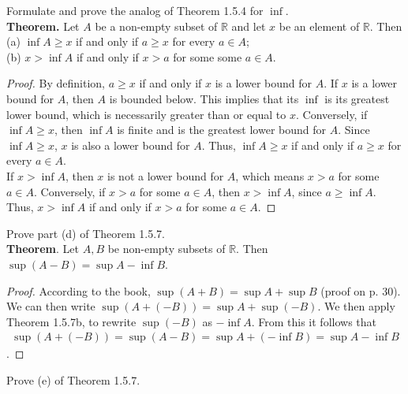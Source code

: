\documentclass[12pt]{book}
\newenvironment{exercise}[2][Exercise]{\begin{trivlist}
\item[\hskip \labelsep {\bfseries #1}\hskip \labelsep {\bfseries #2.}]}{\end{trivlist}}
\begin{document}
\begin{exercise}{1.4.6}
\begin{exercise}{1.5.5}
Formulate and prove the analog of Theorem 1.5.4 for $\inf$. \\

\textbf{Theorem.} Let $A$ be a non-empty subset of $\mathbb{R}$ and let $x$ be an element of $\mathbb{R}$. Then \\ 
(a) $\inf A \geq x$ if and only if $a \geq x$ for every $a \in A$;\\
(b) $x > \inf A$ if and only if $x > a$ for some some $a \in A$.

	\begin{proof}
	By definition, $a \geq x$ if and only if $x$ is a lower bound for $A$. If $x$ is a lower bound for $A$, then $A$ is bounded below. This implies that its $\inf$ is its greatest lower bound, which is necessarily greater than or equal to $x$. Conversely, if $\inf A \geq x$, then $\inf A$ is finite and is the greatest lower bound for $A$. Since $\inf A \geq x$, $x$ is also  a lower bound for $A$. Thus, $\inf A \geq x$ if and only if $a \geq x$ for every $a \in A$. \\
	If $x > \inf A$, then $x$ is not a lower bound for $A$, which means $x >a$ for some $a \in A$. Conversely, if $x > a$ for some $a  \in A$, then $x> \inf A$, since $a \geq \inf A$. Thus, $x > \inf A$ if and only if $x > a$ for some $a \in A$.
	\end{proof}
\end{exercise}




\begin{exercise}{1.5.6}
Prove part (d) of Theorem 1.5.7.\\

\textbf{Theorem}. Let $A,B$ be non-empty subsets of $\mathbb{R}$. Then $\sup (A-B) = \sup A - \inf B$.

	\begin{proof}
	According to the book, $\sup(A+B) = \sup A + \sup B$ (proof on p. 30). We can then write $\sup (A + (-B) ) = \sup A + \sup(-B)$. We then apply Theorem 1.5.7b, to rewrite $\sup(-B)$ as $-\inf A$. From this it follows that 
	\begin{align*}
	\sup(A + (-B)) = \sup(A-B) = \sup A + (- \inf B) = \sup A - \inf B
	\end{align*}.
	\end{proof}
\end{exercise}




\begin{exercise}{1.5.7}
Prove (e) of Theorem 1.5.7. \\


\end{exercise}
\end{exercise}
\end{document}
